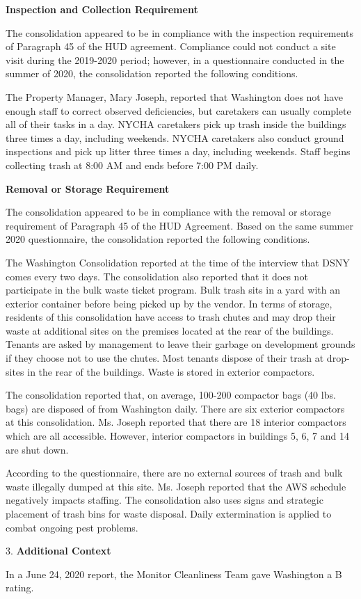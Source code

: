 
\textbf{Inspection and Collection Requirement}

The consolidation appeared to be in compliance with the inspection requirements of Paragraph 45 of the HUD agreement. Compliance could not conduct a site visit during the 2019-2020 period; however, in a questionnaire conducted in the summer of 2020, the consolidation reported the following conditions.

The Property Manager, Mary Joseph, reported that Washington does not have enough staff to correct observed deficiencies, but caretakers can usually complete all of their tasks in a day. NYCHA caretakers pick up trash inside the buildings three times a day, including weekends. NYCHA caretakers also conduct ground inspections and pick up litter three times a day, including weekends. Staff begins collecting trash at 8:00 AM  and ends before 7:00 PM daily. 

\textbf{Removal or Storage Requirement}

The consolidation appeared to be in compliance with the  removal or storage requirement of Paragraph  45 of the HUD Agreement. Based on the same summer 2020 questionnaire, the consolidation reported the following conditions.

The Washington Consolidation reported at the time of the interview that DSNY comes every two days. The consolidation also reported that it does not participate in the bulk waste ticket program. Bulk trash sits in a yard with an exterior container before being picked up by the vendor. In terms of storage, residents of this consolidation have access to trash chutes and may drop their waste at additional sites on the premises located at the rear of the buildings. Tenants are asked by management to leave their garbage on development grounds if they choose not to use the chutes. Most tenants dispose of their trash at drop-sites in the rear of the buildings. Waste is stored in exterior compactors. 

The consolidation reported that, on average, 100-200 compactor bags (40 lbs. bags) are disposed of from Washington daily. There are six exterior compactors at this consolidation. Ms. Joseph reported that there are 18 interior compactors which are all accessible. However, interior compactors in buildings 5, 6, 7 and 14 are shut down.

According to the questionnaire, there are no external sources of trash and bulk waste illegally dumped at this site. Ms. Joseph reported that the AWS schedule negatively impacts staffing. The consolidation also uses signs and strategic placement of trash bins for waste disposal. Daily extermination is applied to combat ongoing pest problems.

3. \textbf{Additional Context}

In a June 24, 2020 report, the Monitor Cleanliness Team gave Washington a B rating. 